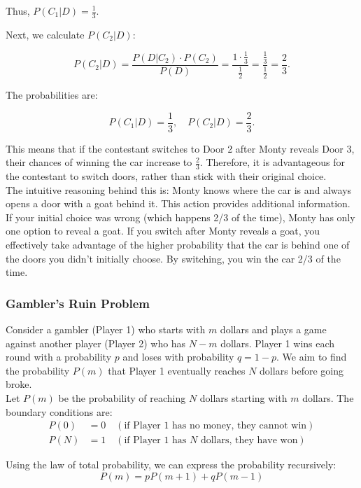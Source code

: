 Thus, \(P(C_1 | D) = \frac{1}{3}\).

Next, we calculate \(P(C_2 | D)\):

\[
P(C_2 | D) = \frac{P(D | C_2) \cdot P(C_2)}{P(D)} = \frac{1 \cdot \frac{1}{3}}{\frac{1}{2}} = \frac{\frac{1}{3}}{\frac{1}{2}} = \frac{2}{3}.
\]

The probabilities are:

\[
P(C_1 | D) = \frac{1}{3}, \quad P(C_2 | D) = \frac{2}{3}.
\]

This means that if the contestant switches to Door 2 after Monty reveals Door 3, their chances of winning the car increase to \( \frac{2}{3} \). Therefore, it is advantageous for the contestant to switch doors, rather than stick with their original choice.\\

The intuitive reasoning behind this is: Monty knows where the car is and always opens a door with a goat behind it. This action provides additional information. If your initial choice was wrong (which happens 2/3 of the time), Monty has only one option to reveal a goat. If you switch after Monty reveals a goat, you effectively take advantage of the higher probability that the car is behind one of the doors you didn't initially choose. By switching, you win the car 2/3 of the time.

\subsubsection{Gambler's Ruin Problem}

Consider a gambler (Player 1) who starts with \( m \) dollars and plays a game against another player (Player 2) who has \( N - m \) dollars. Player 1 wins each round with a probability \( p \) and loses with probability \( q = 1 - p \). We aim to find the probability \( P(m) \) that Player 1 eventually reaches \( N \) dollars before going broke.\\

Let \( P(m) \) be the probability of reaching \( N \) dollars starting with \( m \) dollars. The boundary conditions are:
\begin{align*}
P(0) &= 0 \quad (\text{if Player 1 has no money, they cannot win}) \\
P(N) &= 1 \quad (\text{if Player 1 has } N \text{ dollars, they have won})
\end{align*}

Using the law of total probability, we can express the probability recursively:
\[
P(m) = p P(m+1) + q P(m-1)
\]

